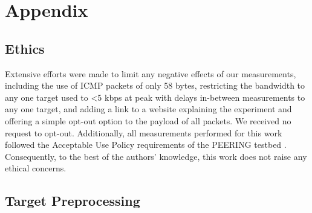 \documentclass[sigconf,nonacm,screen,letterpaper,10pt]{acmart}
\begin{document}
\pagebreak

\newpage

{\small\balance}
\appendix

\hypertarget{appendix}{%
\section{Appendix}\label{appendix}}

\label{sec:appendix}

\hypertarget{ethics}{%
\subsection{Ethics}\label{ethics}}

Extensive efforts were made to limit any negative effects of our
measurements, including the use of ICMP packets of only 58 bytes,
restricting the bandwidth to any one target used to \textless5 kbps at
peak with delays in-between measurements to any one target, and adding a
link to a website explaining the experiment and offering a simple
opt-out option to the payload of all packets. We received no request to
opt-out. Additionally, all measurements performed for this work followed
the Acceptable Use Policy requirements of the PEERING testbed
\cite{schlinker19peering}. Consequently, to the best of the authors'
knowledge, this work does not raise any ethical concerns.

\hypertarget{target-preprocessing}{%
\subsection{Target Preprocessing}\label{target-preprocessing}}

\label{sec:target-processing}
\end{document}
